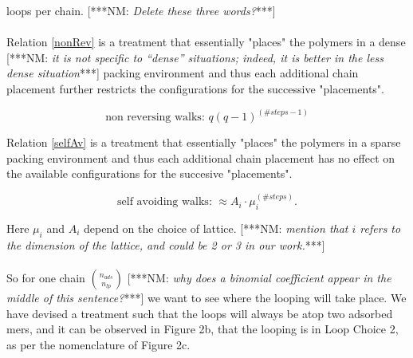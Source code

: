 \documentclass[10pt,letterpaper]{article}
\begin{document}
\noindent loops per chain.   [***NM:  \textit{Delete these three words?}***] \\\\


\noindent Relation \ref{nonRev} is a treatment that essentially "places" the polymers in a dense
[***NM:  \textit{it is not specific to ``dense''
situations; indeed, it is better in the less dense 
situation}***]
packing environment and thus each additional chain placement further restricts the configurations for the successive "placements". 

\begin{equation}
	\text{non reversing walks:  } q(q-1)^{(\#steps-1)}
	\label{nonRev}
\end{equation}

\newpage
\noindent Relation \ref{selfAv} is a treatment that essentially "places" the polymers in a sparse packing environment and thus each additional chain placement has no effect on the available configurations for the succesive "placements".

\begin{equation}
	\text{self avoiding walks:  } \approx A_i\cdot\mu_i^{(\#steps)}.
	\label{selfAv}
\end{equation}


\noindent Here $\mu_i$ and $A_i$ depend on the choice of lattice\cite{Chen2002,Madras2013}.
[***NM: \textit{mention that $i$ refers to the dimension of the lattice, and could be 2 or 3 in our work.}***]\\\\

\noindent So for one chain  $\binom{n_{ads}}{n_{lp}}$ 
[***NM:  \textit{why does a binomial coefficient
appear in the middle of this sentence?}***]
we want to see where the looping will take place. We have devised a treatment such that the loops will always be atop two adsorbed mers, and it can be observed in Figure 2b, that the looping is in Loop Choice 2, as per the nomenclature of Figure 2c.
\end{document}
